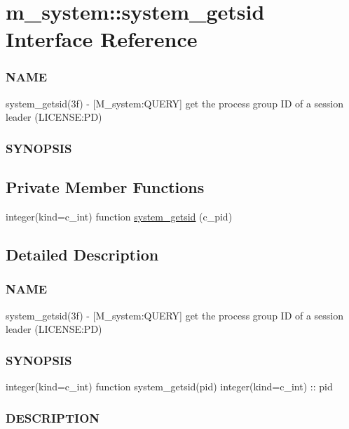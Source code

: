 \hypertarget{interfacem__system_1_1system__getsid}{}\section{m\+\_\+system\+:\+:system\+\_\+getsid Interface Reference}
\label{interfacem__system_1_1system__getsid}


\subsubsection*{N\+A\+ME}

system\+\_\+getsid(3f) -\/ \mbox{[}M\+\_\+system\+:Q\+U\+E\+RY\mbox{]} get the process group ID of a session leader (L\+I\+C\+E\+N\+SE\+:PD) \subsubsection*{S\+Y\+N\+O\+P\+S\+IS} 


\subsection*{Private Member Functions}
\begin{DoxyCompactItemize}
\item 
integer(kind=c\+\_\+int) function \mbox{\hyperlink{interfacem__system_1_1system__getsid_a0a665987d35f0b81a2358df6c0173122}{system\+\_\+getsid}} (c\+\_\+pid)
\end{DoxyCompactItemize}


\subsection{Detailed Description}
\subsubsection*{N\+A\+ME}

system\+\_\+getsid(3f) -\/ \mbox{[}M\+\_\+system\+:Q\+U\+E\+RY\mbox{]} get the process group ID of a session leader (L\+I\+C\+E\+N\+SE\+:PD) \subsubsection*{S\+Y\+N\+O\+P\+S\+IS}

integer(kind=c\+\_\+int) function system\+\_\+getsid(pid) integer(kind=c\+\_\+int) \+:\+: pid \subsubsection*{D\+E\+S\+C\+R\+I\+P\+T\+I\+ON}

